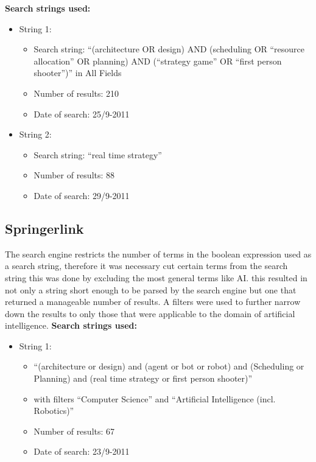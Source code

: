 \textbf{Search strings used:}
\begin{itemize}
\item String 1:
\begin{itemize}
\item Search string:  ``(architecture OR design) AND (scheduling OR ``resource allocation'' OR planning) AND (``strategy game'' OR ``first person shooter'')'' in All Fields
\item Number of results: 210
\item Date of search: 25/9-2011
\end{itemize}
\item String 2:
\begin{itemize}
\item Search string: ``real time strategy''
\item Number of results: 88
\item Date of search: 29/9-2011
\end{itemize}
\end{itemize}

\subsection{Springerlink}
\label{sub:springerlink}
The search engine restricts the number of terms in the boolean expression used as a search string, therefore it was necessary cut certain terms from the search string this was done by excluding the most general terms like AI. this resulted in not only a string short enough to be parsed by the search engine but one that returned a manageable number of results. A filters were used to further narrow down the results to only those that were applicable to the domain of artificial intelligence. 
\textbf{Search strings used:}
\begin{itemize}
\item String 1:
\begin{itemize}
\item ``(architecture or design) and (agent or bot or robot) and (Scheduling or Planning) and (real time strategy or first person shooter)''
\item with filters ``Computer Science'' and ``Artificial Intelligence \newline (incl. Robotics)''
\item Number of results: 67
\item Date of search: 23/9-2011
\end{itemize}
\end{itemize}

